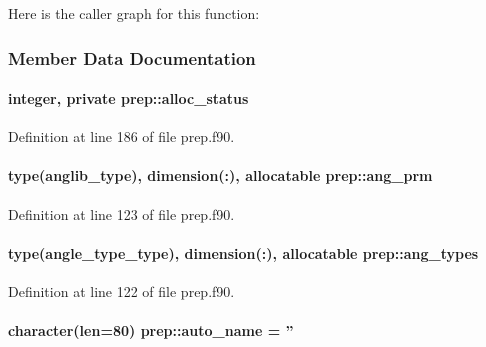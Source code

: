 Here is the caller graph for this function\-:




\subsubsection{Member Data Documentation}
\hypertarget{classprep_a87d974b870f3e4297b7616cd4516d489}{
\paragraph[{alloc\-\_\-status}]{\setlength{\rightskip}{0pt plus 5cm}integer, private prep\-::alloc\-\_\-status\hspace{0.3cm}{\ttfamily [private]}}}\label{classprep_a87d974b870f3e4297b7616cd4516d489}


Definition at line 186 of file prep.\-f90.

\hypertarget{classprep_a29c0f063e1579b1087d6e9bd35d11f9f}{
\paragraph[{ang\-\_\-prm}]{\setlength{\rightskip}{0pt plus 5cm}type(anglib\-\_\-type), dimension(\-:), allocatable prep\-::ang\-\_\-prm}}\label{classprep_a29c0f063e1579b1087d6e9bd35d11f9f}


Definition at line 123 of file prep.\-f90.

\hypertarget{classprep_a35c47c52d6cde56a3edbbad318eb0735}{
\paragraph[{ang\-\_\-types}]{\setlength{\rightskip}{0pt plus 5cm}type({\bf angle\-\_\-type\-\_\-type}), dimension(\-:), allocatable prep\-::ang\-\_\-types}}\label{classprep_a35c47c52d6cde56a3edbbad318eb0735}


Definition at line 122 of file prep.\-f90.

\hypertarget{classprep_a83b69e52469478c0d64cb6bd2ad3060f}{
\paragraph[{auto\-\_\-name}]{\setlength{\rightskip}{0pt plus 5cm}character(len=80) prep\-::auto\-\_\-name = ''}}\label{classprep_a83b69e52469478c0d64cb6bd2ad3060f}


